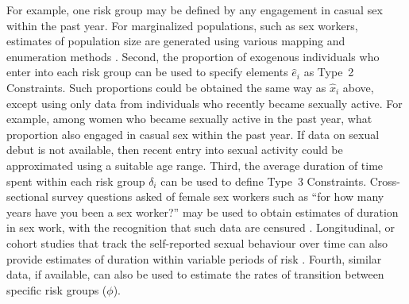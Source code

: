 For example, one risk group may be defined by any engagement in casual sex within the past year.
For marginalized populations, such as sex workers, estimates of population size
are generated using various mapping and enumeration methods \citep{Abdul-Quader2014}.
Second, the proportion of exogenous individuals who enter into each risk group
can be used to specify elements $\hat{e}_i$ as Type~2 Constraints.
Such proportions could be obtained the same way as $\hat{x}_i$ above,
except using only data from individuals who recently became sexually active.
For example, among women who became sexually active in the past year,
what proportion also engaged in casual sex within the past year.
If data on sexual debut is not available,
then recent entry into sexual activity could be approximated using
a suitable age range.
Third, the average duration of time spent within each risk group $\delta_i$
can be used to define Type~3 Constraints.
Cross-sectional survey questions asked of female sex workers such as	
``for how many years have you been a sex worker?''
may be used to obtain estimates of duration in sex work,
with the recognition that such data are censured \citep{Watts2010}.
Longitudinal, or cohort studies
that track the self-reported sexual behaviour over time can also provide 
estimates of duration within variable periods of risk \citep{Fergus2007}.
Fourth, similar data, if available, can also be used to estimate
the rates of transition between specific risk groups ($\phi$).
